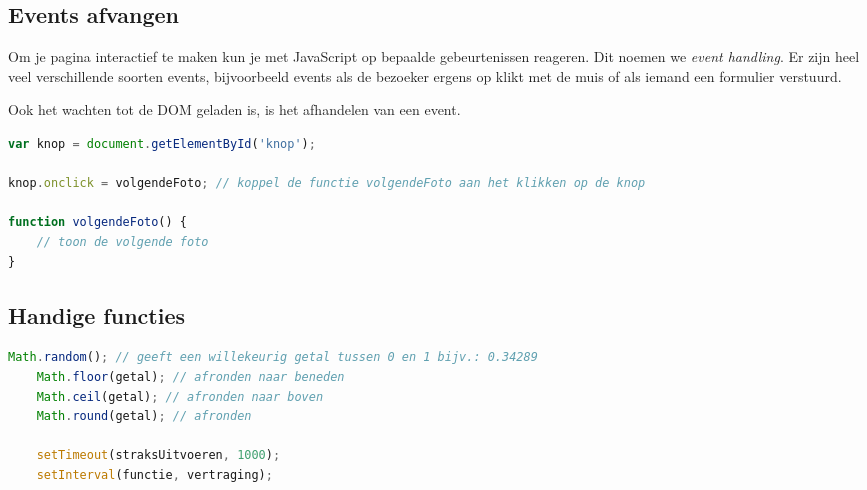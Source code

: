 \documentclass[8pt,pagesize,footinclude=false,headinclude=false]{scrartcl}
\begin{document}
\begin{multicols*}{3}
\subsection*{Events afvangen}
Om je pagina interactief te maken kun je met JavaScript op bepaalde gebeurtenissen reageren. Dit noemen we \emph{event handling}. Er zijn heel veel verschillende soorten events, bijvoorbeeld events als de bezoeker ergens op klikt met de muis of als iemand een formulier verstuurd.

Ook het wachten tot de DOM geladen is, is het afhandelen van een event.

\begin{lstlisting}[language=JavaScript]
var knop = document.getElementById('knop');

knop.onclick = volgendeFoto; // koppel de functie volgendeFoto aan het klikken op de knop

function volgendeFoto() {
	// toon de volgende foto
}
\end{lstlisting}

\subsection*{Handige functies}
\begin{lstlisting}[language=JavaScript]
	Math.random(); // geeft een willekeurig getal tussen 0 en 1 bijv.: 0.34289
	Math.floor(getal); // afronden naar beneden
	Math.ceil(getal); // afronden naar boven
	Math.round(getal); // afronden
	
	setTimeout(straksUitvoeren, 1000);
	setInterval(functie, vertraging);
\end{lstlisting}

\end{multicols*}
\end{document}
